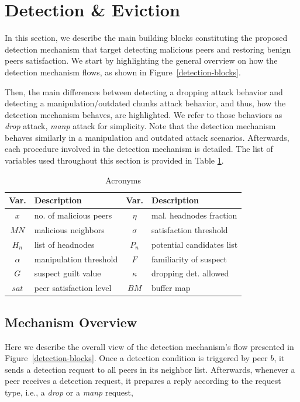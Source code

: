 \section{Detection \& Eviction}
\label{sec:detection}

In this section, we describe the main building blocks constituting the proposed detection mechanism that target detecting malicious peers and restoring benign peers satisfaction.
We start by highlighting the general overview on how the detection mechanism flows, as shown in Figure~\ref{detection-blocks}.

Then, the main differences between detecting a dropping attack behavior and detecting a manipulation/outdated chunks attack behavior, and thus, how the detection mechanism behaves, are highlighted.
We refer to those behaviors as \textit{drop} attack, \textit{manp} attack for simplicity. 
Note that the detection mechanism behaves similarly in a manipulation and outdated attack scenarios.
Afterwards, each procedure involved in the detection mechanism is detailed. 
The list of variables used throughout this section is provided in Table \ref{tab:acronyms}.

\begin{table}[ht]
\center
\caption{Acronyms}
\begin{tabular}{|c|l||c|l|}
\hline

\bf{Var.} & \bf{Description}  & \bf{Var.} & \bf{Description} \\\hline\hline
$x$ & no. of malicious peers & $\eta$ & mal. headnodes fraction\\\hline
$MN$ & malicious neighbors & $\sigma$ & satisfaction threshold\\\hline
$H_n$ & list of headnodes & $P_n$ & potential candidates list \\\hline
$\alpha$ & manipulation threshold& $F$ & familiarity of suspect \\\hline
$G$ & suspect guilt value & $\kappa$ & dropping det. allowed\\\hline
$sat$ & peer satisfaction level& $BM$ & buffer map\\\hline
\end{tabular}
\label{tab:acronyms}
\end{table}

\subsection{Mechanism Overview}
Here we describe the overall view of the detection mechanism's flow presented in Figure~\ref{detection-blocks}.
Once a detection condition is triggered by peer $b$, it sends a detection request to all peers in its neighbor list.
Afterwards, whenever a peer receives a detection request, it prepares a reply according to the request type, i.e., a \textit{drop} or a \textit{manp} request, 

